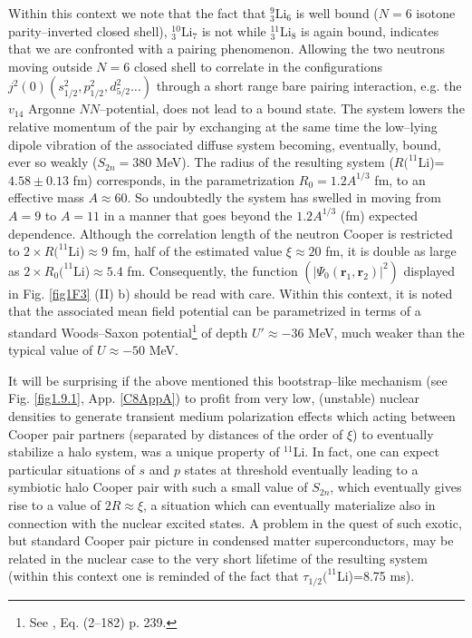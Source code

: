  Within this context we note that the fact that $^9_3$Li$_6$ is well bound ($N=6$ isotone parity--inverted closed shell), $^{10}_3$Li$_7$ is not while $^{11}_3$Li$_8$ is again bound, indicates that we are confronted with a pairing phenomenon. Allowing the two neutrons moving outside $N=6$ closed shell to correlate in the configurations $j^2(0) (s_{1/2}^2, p_{1/2}^2, d_{5/2}^2\dots)$ through a short range bare pairing interaction, e.g. the $v_{14}$ Argonne $NN$--potential, does not lead to a bound state. The system lowers the relative momentum of the pair by exchanging at the same time the low--lying dipole vibration of the associated diffuse system becoming, eventually, bound, ever so weakly ($S_{2n}=380$ MeV). The radius of the resulting system ($R(^{11}$Li)=$4.58\pm 0.13$ fm) corresponds, in the parametrization $R_0=1.2 A^{1/3}$ fm, to an effective mass $A\approx 60$. So undoubtedly the system has swelled in moving from $A=9$ to $A=11$ in a manner that goes beyond the $1.2A^{1/3}$ (fm) expected dependence. Although the correlation length of the neutron Cooper is restricted to $2\times R(^{11}$Li)$\approx 9$ fm, half of the estimated value $\xi\approx 20$ fm, it is double as large as $2\times R_0(^{11}$Li)$\approx 5.4$ fm. Consequently, the function $(|\Psi_0(\mathbf r_1,\mathbf r_2)|^2)$ displayed  in Fig. \ref{fig1F3} (II) b) should be read with care.
Within this context, it is  noted that the associated mean field potential can be parametrized in terms of a standard Woods--Saxon potential\footnote{See \cite{Bohr:69}, Eq. (2--182) p. 239.} of depth $U'\approx-36$ MeV, much weaker than the typical value of $U\approx-50$ MeV.

It will be surprising if the above mentioned this bootstrap--like mechanism (see Fig. \ref{fig1.9.1}, App. \ref{C8AppA}) to profit from very low, (unstable) nuclear densities to generate transient medium polarization effects which acting between Cooper pair partners (separated by distances of the order of $\xi$) to eventually stabilize a halo system, was a unique property of $^{11}$Li. In fact, one can expect particular situations of $s$ and $p$ states at threshold eventually leading to a symbiotic halo Cooper pair with such a small value of $S_{2n}$, which  eventually gives rise to a value of $2R\approx\xi$, a situation which can eventually materialize also in connection with the nuclear excited states. A problem in the quest of such exotic, but standard Cooper pair picture in condensed matter superconductors, may be related in the nuclear case to the very short lifetime of the resulting system (within this context one is reminded of the fact that $\tau_{1/2}(^{11}$Li)=8.75 ms).


